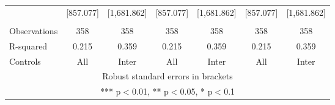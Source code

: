 \begin{tabular}{lcccccc}
 & [857.077] & [1,681.862] & [857.077] & [1,681.862] & [857.077] & [1,681.862] \\
 &  &  &  &  &  &  \\
Observations & 358 & 358 & 358 & 358 & 358 & 358 \\
R-squared & 0.215 & 0.359 & 0.215 & 0.359 & 0.215 & 0.359 \\
 Controls & All & Inter & All & Inter & All & Inter \\ \hline
\multicolumn{7}{c}{ Robust standard errors in brackets} \\
\multicolumn{7}{c}{ *** p$<$0.01, ** p$<$0.05, * p$<$0.1} \\
\end{tabular}
